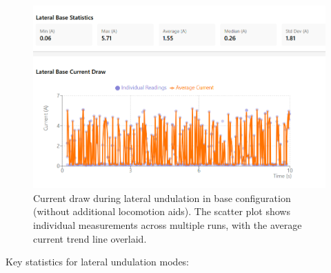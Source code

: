 \documentclass[12pt,a4paper]{report}
\begin{document}
\begin{figure}[H]
    \centering
    \includegraphics[width=12cm]{media/lateral_base_current.png}
    \caption{Current draw during lateral undulation in base configuration (without additional locomotion aids). The scatter plot shows individual measurements across multiple runs, with the average current trend line overlaid.}
    \label{fig:lateral_base_current}
\end{figure}

Key statistics for lateral undulation modes:

\begin{table}[H]
    \centering
    \caption{Current consumption statistics across different lateral undulation configurations.}
    \label{tab:lateral_current_measurements}
\end{table}
\end{document}
